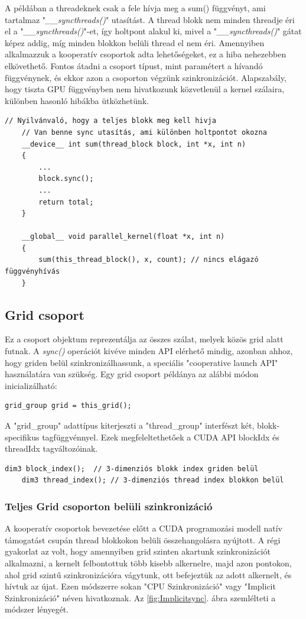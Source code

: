A példában a threadeknek csak a fele hívja meg a sum() függvényt, ami tartalmaz "\textit{\_\_syncthreads()}" utasítást. A thread blokk nem minden threadje éri el a "\textit{\_\_syncthreads()}"-et, így holtpont alakul ki, mivel a "\textit{\_\_syncthreads()}" gátat képez addig, míg minden blokkon belüli thread el nem éri.
Amennyiben alkalmazzuk a kooperatív csoportok adta lehetőségeket, ez a hiba nehezebben elkövethető. Fontos átadni a csoport típust, mint paramétert a hívandó függvénynek, és ekkor azon a csoporton végzünk szinkronizációt. Alapszabály, hogy tiszta GPU függvényben nem hivatkozunk közvetlenül  a kernel szálaira, különben hasonló hibákba ütközhetünk.
\begin{lstlisting}[style=CStyle]
	// Nyilvánvaló, hogy a teljes blokk meg kell hivja
	// Van benne sync utasítás, ami különben holtpontot okozna
	__device__ int sum(thread_block block, int *x, int n) 
	{
		...
		block.sync();
		...
		return total;
	}
	
	__global__ void parallel_kernel(float *x, int n)
	{
		sum(this_thread_block(), x, count); // nincs elágazó függvényhívás
	}
\end{lstlisting}


\subsection{Grid csoport}
Ez a csoport objektum reprezentálja az összes szálat, melyek közös grid alatt futnak. A \textit{sync()} operációt kivéve minden API elérhető mindig, azonban ahhoz, hogy griden belül szinkronizálhassunk, a speciális "cooperative launch API" használatára van szükség.
Egy grid csoport példánya az alábbi módon inicializálható:
\begin{lstlisting}[style=CStyle]
	grid_group grid = this_grid();
\end{lstlisting}
A "grid\_group" adattípus kiterjeszti a "thread\_group" interfészt két, blokk-specifikus tagfüggvénnyel. Ezek megfeleltethetőek a CUDA API blockIdx és threadIdx tagváltozóinak.
\begin{lstlisting}[style=CStyle]
	dim3 block_index();  // 3-dimenziós blokk index griden belül
	dim3 thread_index(); // 3-dimenziós thread index blokkon belül
\end{lstlisting}

\subsubsection{Teljes Grid csoporton belüli szinkronizáció}
\label{subsubsec:Grid}
A kooperatív csoportok bevezetése előtt a CUDA programozási modell natív támogatást csupán thread blokkokon belüli összehangolásra nyújtott. A régi gyakorlat az volt, hogy amennyiben grid szinten akartunk szinkronizációt alkalmazni, a kernelt felbontottuk több kisebb alkernelre, majd azon pontokon, ahol grid szintű szinkronizációra vágytunk, ott befejeztük az adott alkernelt, és hívtuk az újat. Ezen módszerre sokan "CPU Szinkronizáció" vagy "Implicit Szinkronizáció" néven hivatkoznak. Az \ref{fig:Implicitsync}. ábra szemlélteti a módszer lényegét. \cite{implicitSzink}

